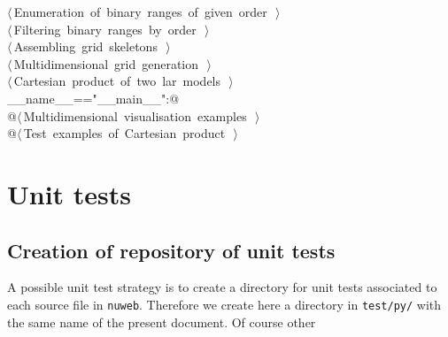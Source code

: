\documentclass[11pt,oneside]{article}	%
\begin{document}
\begin{flushleft}
\begin{list}{}{}
\mbox{}\verb@@\hbox{$\langle\,$Enumeration of binary ranges of given order\nobreak\ {\footnotesize {}}$\,\rangle$}\verb@@\\
\mbox{}\verb@@\hbox{$\langle\,$Filtering binary ranges by order\nobreak\ {\footnotesize {}}$\,\rangle$}\verb@@\\
\mbox{}\verb@@\hbox{$\langle\,$Assembling grid skeletons\nobreak\ {\footnotesize {}}$\,\rangle$}\verb@@\\
\mbox{}\verb@@\hbox{$\langle\,$Multidimensional grid generation\nobreak\ {\footnotesize {}}$\,\rangle$}\verb@@\\
\mbox{}\verb@@\hbox{$\langle\,$Cartesian product of two lar models\nobreak\ {\footnotesize {}}$\,\rangle$}\verb@@\\
\mbox{}\verb@if __name__=="__main__":@\\
\mbox{}\verb@   @\hbox{$\langle\,$Multidimensional visualisation examples\nobreak\ {\footnotesize {}}$\,\rangle$}\verb@@\\
\mbox{}\verb@   @\hbox{$\langle\,$Test examples of Cartesian product\nobreak\ {\footnotesize {}}$\,\rangle$}\verb@@\\
\mbox{}\verb@@{\NWsep}
\end{list}
\vspace{-2ex}
\end{flushleft}


\section{Unit tests}
\label{sec:tests}

\subsection{Creation of repository of unit tests}

A possible unit test strategy is to create a directory for unit tests associated to each source file in \texttt{nuweb}. Therefore we create here a directory in \texttt{test/py/} with the same name of the present document. Of course other 
\end{document}
